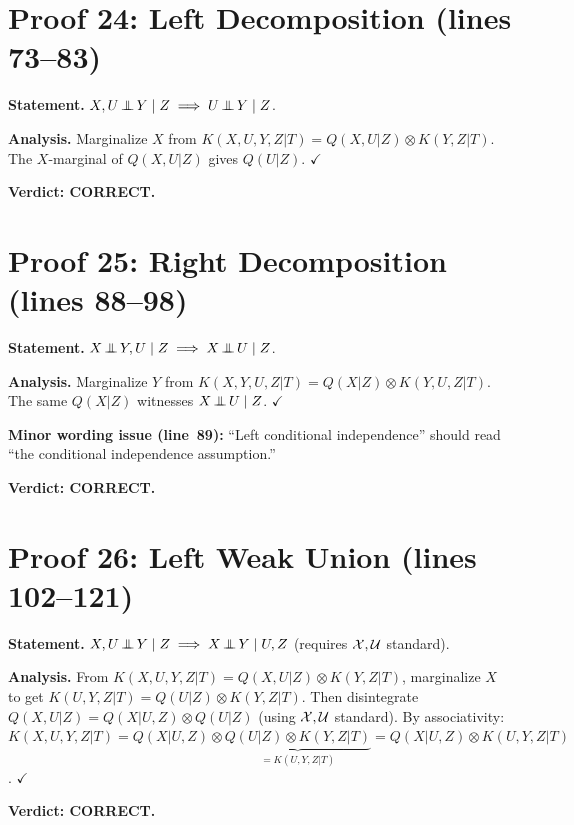 \documentclass{article}
\begin{document}
\section{Proof 24: Left Decomposition (lines 73--83)}

\textbf{Statement.} $X,U\operatorname*{\perp\mkern-11mu\perp} Y\mid Z \implies U\operatorname*{\perp\mkern-11mu\perp} Y\mid Z$.

\textbf{Analysis.}
Marginalize $X$ from $K(X,U,Y,Z|T)=Q(X,U|Z)\otimes K(Y,Z|T)$.
The $X$-marginal of $Q(X,U|Z)$ gives $Q(U|Z)$.  $\checkmark$

\textbf{Verdict: CORRECT.}

\section{Proof 25: Right Decomposition (lines 88--98)}

\textbf{Statement.} $X\operatorname*{\perp\mkern-11mu\perp} Y,U\mid Z \implies X\operatorname*{\perp\mkern-11mu\perp} U\mid Z$.

\textbf{Analysis.}
Marginalize $Y$ from $K(X,Y,U,Z|T)=Q(X|Z)\otimes K(Y,U,Z|T)$.
The same $Q(X|Z)$ witnesses $X\operatorname*{\perp\mkern-11mu\perp} U\mid Z$.  $\checkmark$

\textbf{Minor wording issue (line~89):} ``Left conditional independence'' should read
``the conditional independence assumption.''

\textbf{Verdict: CORRECT.}

\section{Proof 26: Left Weak Union (lines 102--121)}

\textbf{Statement.} $X,U\operatorname*{\perp\mkern-11mu\perp} Y\mid Z \implies X\operatorname*{\perp\mkern-11mu\perp} Y\mid U,Z$
(requires $\mathcal{X},\mathcal{U}$ standard).

\textbf{Analysis.}
From $K(X,U,Y,Z|T)=Q(X,U|Z)\otimes K(Y,Z|T)$, marginalize $X$ to get
$K(U,Y,Z|T)=Q(U|Z)\otimes K(Y,Z|T)$.  Then disintegrate $Q(X,U|Z)=Q(X|U,Z)\otimes Q(U|Z)$
(using $\mathcal{X},\mathcal{U}$ standard).  By associativity:
$K(X,U,Y,Z|T) = Q(X|U,Z)\otimes\underbrace{Q(U|Z)\otimes K(Y,Z|T)}_{=K(U,Y,Z|T)}
= Q(X|U,Z)\otimes K(U,Y,Z|T)$.  $\checkmark$

\textbf{Verdict: CORRECT.}
\end{document}
